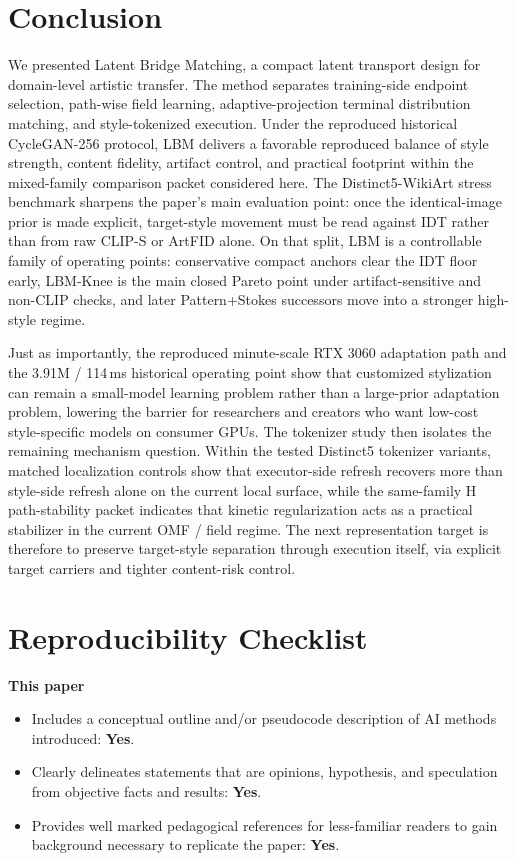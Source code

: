 \documentclass[letterpaper]{article}
\begin{document}
\section{Conclusion}
We presented Latent Bridge Matching, a compact latent transport design for domain-level artistic transfer. The method separates training-side endpoint selection, path-wise field learning, adaptive-projection terminal distribution matching, and style-tokenized execution. Under the reproduced historical CycleGAN-256 protocol, LBM delivers a favorable reproduced balance of style strength, content fidelity, artifact control, and practical footprint within the mixed-family comparison packet considered here. The Distinct5-WikiArt stress benchmark sharpens the paper's main evaluation point: once the identical-image prior is made explicit, target-style movement must be read against IDT rather than from raw CLIP-S or ArtFID alone. On that split, LBM is a controllable family of operating points: conservative compact anchors clear the IDT floor early, LBM-Knee is the main closed Pareto point under artifact-sensitive and non-CLIP checks, and later Pattern+Stokes successors move into a stronger high-style regime.

Just as importantly, the reproduced minute-scale RTX 3060 adaptation path and the 3.91M / 114\,ms historical operating point show that customized stylization can remain a small-model learning problem rather than a large-prior adaptation problem, lowering the barrier for researchers and creators who want low-cost style-specific models on consumer GPUs. The tokenizer study then isolates the remaining mechanism question. Within the tested Distinct5 tokenizer variants, matched localization controls show that executor-side refresh recovers more than style-side refresh alone on the current local surface, while the same-family H path-stability packet indicates that kinetic regularization acts as a practical stabilizer in the current OMF / field regime. The next representation target is therefore to preserve target-style separation through execution itself, via explicit target carriers and tighter content-risk control.



\small
\setlength{\itemsep}{1pt}
\setlength{\parskip}{2pt}
\section*{Reproducibility Checklist}
\noindent\textbf{This paper}
\begin{itemize}
\item Includes a conceptual outline and/or pseudocode description of AI methods introduced: \textbf{Yes}.
\item Clearly delineates statements that are opinions, hypothesis, and speculation from objective facts and results: \textbf{Yes}.
\item Provides well marked pedagogical references for less-familiar readers to gain background necessary to replicate the paper: \textbf{Yes}.
\end{itemize}
\end{document}
